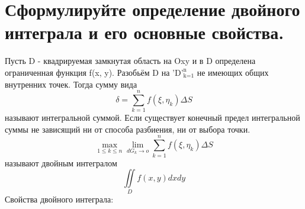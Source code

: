 \documentclass[16pt]{extarticle}
\begin{document}
\section{Сформулируйте определение двойного интеграла и его основные свойства.}
Пусть D - квадрируемая замкнутая область на Oxy и в D определена ограниченная функция f(x, y). Разобьём D на $\text{'{D}'}^\text{n}_\text{k=1}$ не имеющих общих внутренних точек. Тогда сумму вида
\begin{equation}
  \delta = \sum_{k=1}^{n} f(\xi, \eta_k) \Delta{S}
\end{equation}
называют интегральной суммой.
Если существует конечный предел интегральной суммы не зависящий ни от способа разбиения, ни от выбора точки.
\begin{equation}
  \max\limits_\text{$1 \leq k \leq n$} \lim_{dG_k \to o} \sum_{k=1}^{n} f(\xi, \eta_k) \Delta{S}
\end{equation}
называют двойным интегралом
\begin{equation}
  \iint\limits_D f(x,y) dxdy
\end{equation}
Свойства двойного интеграла:
\end{document}
